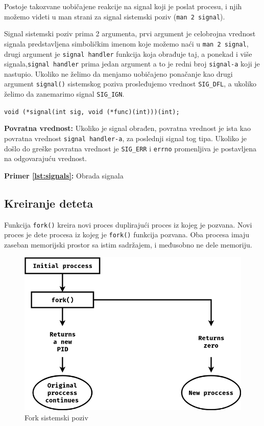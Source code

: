 \documentclass[a4paper, 11pt]{article}
\newcommand{\scode}[3] {
	\hspace{.06\textwidth} 
	\begin{minipage}[t]{.88\textwidth} %
		\begin{mdframed}[topline=true,bottomline=true,leftline=true,rightline=true,backgroundcolor=gray!22, linecolor=gray!60!black,roundcorner=1mm]
			 

	\begin{center}
		\caption{\textbf{Primer \ref{lst:#3}:} #2}
	\end{center}
	\end{mdframed}
	\end{minipage}

}
\begin{document}
Postoje takozvane uobičajene reakcije na signal koji je poslat procesu, i njih možemo videti u man strani za signal sistemski poziv (\texttt{man 2 signal}).   

Signal sistemski poziv prima 2 argumenta, prvi argument je celobrojna vrednost signala predstavljena simboličkim imenom koje možemo naći u \texttt{man 2 signal}, drugi argument je \texttt{signal handler} funkcija koja obrađuje taj, a ponekad i više signala,\texttt{signal handler} prima jedan argument a to je redni broj \texttt{signal-a} koji je nastupio. Ukoliko ne želimo da menjamo uobičajeno ponačanje kao drugi argument \texttt{signal()} sistemskog poziva prosleđujemo vrednost \texttt{SIG\_DFL}, a ukoliko želimo da zanemarimo signal \texttt{SIG\_IGN}. 

\begin{center}
	\texttt{void (*signal(int sig, void (*func)(int)))(int);}
\end{center}

\textbf{Povratna vrednost:} Ukoliko je signal obrađen, povratna vrednost je ista kao povratna vrednost \texttt{signal handler-a}, za poslednji signal tog tipa. Ukoliko je došlo do greške povratna vrednost je \texttt{SIG\_ERR} i \texttt{errno} promenljiva je postavljena na odgovarajuću vrednost.

\scode{signals.c}{Obrada signala}{signals}

\newpage
\subsection{Kreiranje deteta}

Funkcija \texttt{fork()} kreira novi proces duplirajući proces iz kojeg je pozvana. Novi proces je dete procesa iz kojeg je \texttt{fork()} funkcija pozvana. Oba procesa imaju zaseban memorijski prostor sa istim sadržajem, i međusobno ne dele memoriju.

\vspace{2mm} 
\begin{figure}[h]
	\centering
	\includegraphics[width=.48\textwidth]{fsc.png} %
	\caption{Fork sistemski poziv}
	\label{fig:fsc}
\end{figure}
\vspace{2mm} 
\end{document}
